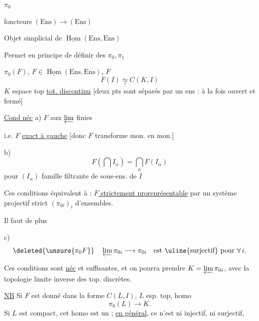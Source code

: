 $\pi_0$

foncteurs $(\mathrm{Ens})\to(\mathrm{Ens})$

Objet simplicial de $\underline{\operatorname{Hom}}(\mathrm{Ens},\mathrm{Ens})$

Permet en principe de définir des $\pi_0,\pi_1$

$\pi_0(F)$, $F\in\underline{\operatorname{Hom}}(\mathrm{Ens},\mathrm{Ens})$, $F$
\[
F(I)\underset{?}{\simeq}C(K,I)
\]
$K$ espace top \uline{tot. discontinu}
[deux pts sont séparés par un ens : à la fois ouvert et fermé]

\uline{Cond néc} a) $F$  aux
 $\varprojlim$ finies

i.e. $F$ \uline{exact à gauche}
[donc $F$ transforme mon. en mon.]

b) \[
F(\bigcap I_\alpha)=\bigcap_\alpha F(I_\alpha)
\]
pour $(I_\alpha)$ famille filtrante de sous-ens. de $I$

Ces conditions équivalent à : \uline{$F$ strictement proreprésentable}
par un système projectif strict $(\pi_{0i})_i$  d'ensembles.

Il faut de plus

c) \[
\deleted{\unsure{\pi_0F}}\quad
\varprojlim\pi_{0i}\longrightarrow\pi_{0i}
\quad\text{est \uline{surjectif} pour }\forall\,i.
\]

Ces conditions sont \uline{néc} et suffisantes, et on pourra prendre
$K=\varprojlim\pi_{0i}$, avec la topologie limite inverse des top. discrètes.

\uline{NB} Si $F$ est donné dans la forme $C(L,I)$, $L$ esp. top, homo
\[
\pi_0(L)\longrightarrow K.
\]
Si $L$ est  compact, cet homo est un
; \uline{en général}, ce n'est ni injectif, ni surjectif,

